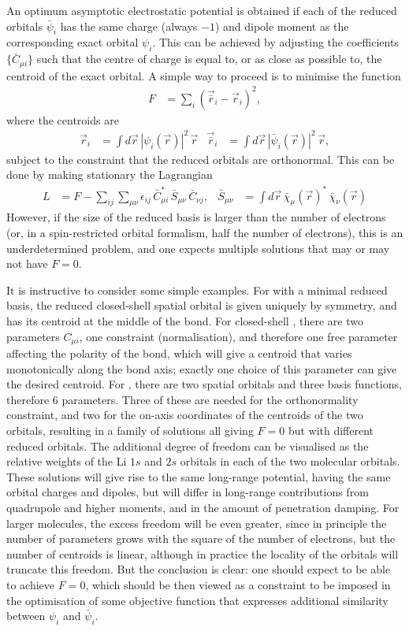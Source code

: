\documentclass[journal=jacsat,manuscript=article]{achemso}
\begin{document}
An optimum asymptotic electrostatic potential is obtained if each of the reduced orbitals $\bar\psi_i$
has the same charge (always $-1$) and dipole moment as the corresponding exact orbital $\psi_i$. This can be achieved by adjusting the coefficients
$\{\bar C_{\mu i}\}$ such that the centre of charge is equal to, or as close as possible to, the centroid of the exact orbital.
A simple way to proceed is to minimise the function
\begin{align}
    F &= \sum_i (\vec{\bar r}_i - \vec r_i)^2
    ,
\end{align}
where the centroids are
\begin{align}
    \vec r_i &= \int d\vec r\, |\psi_i(\vec r)|^2\,\vec r
    &
    \vec{\bar r}_i &= \int d\vec r\, |\bar\psi_i(\vec r)|^2\,\vec r
    ,
\end{align}
subject to the constraint that the reduced orbitals are orthonormal. This can be done by making stationary the Lagrangian
\begin{align}
    L &= F - \sum_{ij} \sum_{\mu\nu} \epsilon_{ij}\,\bar C_{\mu i}^*\,\bar S_{\mu\nu}
    \,\bar C_{\nu j}
    ,
    &
    \bar S_{\mu\nu} &= \int d\vec r\, \bar\chi_\mu(\vec r)^*\,\bar\chi_\nu(\vec r)
\end{align}
However, if the size of the reduced basis is larger than the number of electrons (or, in a spin-restricted orbital formalism, half the number of electrons), this is an underdetermined problem, and one expects multiple solutions that may or may not have $F=0$.

It is instructive to consider some simple examples. For  with a minimal reduced basis, the reduced closed-shell spatial orbital is given uniquely by symmetry, and has its centroid at the middle of the bond.
For closed-shell , there are two parameters $C_{\mu i}$, one constraint (normalisation), and therefore one free parameter affecting the polarity of the bond, which will give a centroid that varies monotonically along the bond axis; exactly one choice of this parameter can give the desired centroid.
For , 
there are two spatial orbitals and three basis functions, therefore 6 parameters. Three of these are needed for the orthonormality constraint, and two for the on-axis coordinates of the centroids of the two orbitals, resulting in a family of solutions all giving $F=0$ but with different reduced orbitals. The additional degree of freedom can be visualised as the relative weights of the Li $1s$ and $2s$ orbitals in each of the two molecular orbitals. These solutions will give rise to the same long-range potential, having the same orbital charges and dipoles, but will differ in long-range contributions from quadrupole and higher moments, and in the amount of penetration damping.
For larger molecules, the excess freedom will be even greater, since in principle the number of parameters grows with the square of the number of electrons, but the number of centroids is linear, although in practice the locality of the orbitals will truncate this freedom. But the conclusion is clear: one should  expect to be able to achieve $F=0$, which should be then viewed as a constraint to be imposed in the optimisation of some objective function that expresses additional similarity between $\psi_i$ and $\bar\psi_i$.
\end{document}
